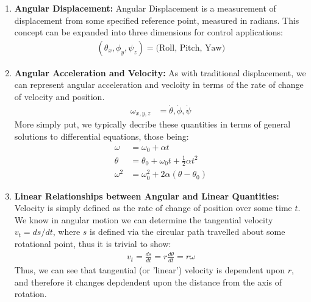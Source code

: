 \documentclass{book}
\begin{document}
\begin{enumerate}
	\item \textbf{Angular Displacement:} Angular Displacement is a measurement of displacement from some specified reference point, measured in radians. This concept can be expanded into three dimensions for control applications:
	\begin{align*}
		(\theta_x, \phi_y, \psi_z) = \text{(Roll, Pitch, Yaw)}
	\end{align*} 
	\item \textbf{Angular Acceleration and Velocity:} As with traditional displacement, we can represent angular acceleration and vecloity in terms of the rate of change of velocity and position.
	\begin{align*}
		\omega_{x,y,z} &= \dot{\theta}, \dot{\phi}, \dot{\psi}
	\end{align*}
	More simply put, we typically decribe these quantities in terms of general solutions to differential equations, those being:
	\begin{align*}
		\omega &= \omega_0 + \alpha t \\
		\theta &= \theta_0 + \omega_0 t + \frac{1}{2}\alpha t^2 \\
		\omega^2 &= \omega_0^2 + 2 \alpha(\theta - \theta_0) 
	\end{align*}
	\item \textbf{Linear Relationships between Angular and Linear Quantities:}
	Velocity is simply defined as the rate of change of position over some time $t$. We know in angular motion we can determine the tangential velocity $v_t = ds/dt$, where $s$ is defined via the circular path travelled about some rotational point, thus it is trivial to show:
	\begin{align*}
		v_t = \frac{ds}{dt} = r \frac{d\theta}{dt} = r\omega
	\end{align*}
	Thus, we can see that tangential (or 'linear') velocity is dependent upon $r$, and therefore it changes depdendent upon the distance from the axis of rotation. \newline
	

\end{enumerate}
\end{document}

